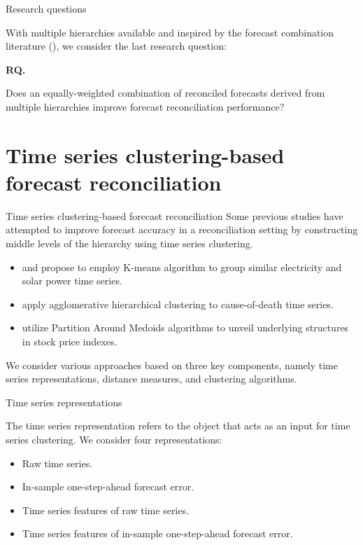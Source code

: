 \documentclass[aspectratio=169]{beamer}
\newcounter{researchquestion}
\newenvironment{researchquestion}{%
    \refstepcounter{researchquestion}%
    \par\medskip\noindent%
    \textbf{RQ\theresearchquestion.}~%
}{\medskip}
\begin{document}
\begin{frame}{Research questions}
	
	With {\color{red} multiple hierarchies available} and inspired by the forecast combination literature (\citealp{wangForecastCombinations50year2022}), we consider the last research question:

	\begin{researchquestion}
		Does an equally-weighted combination of reconciled forecasts derived from multiple hierarchies improve forecast reconciliation performance?
	\end{researchquestion}
\end{frame}



\section{Time series clustering-based forecast reconciliation}

\begin{frame}{Time series clustering-based forecast reconciliation}
	Some previous studies have attempted to improve forecast accuracy in a reconciliation setting by constructing middle levels of the hierarchy using time series clustering.

	\begin{itemize}
		\item \cite{pangHierarchicalElectricityTime2018} and \cite{pangHierarchicalElectricityTime2022} propose to employ K-means algorithm to group similar electricity and solar power time series.
		\item \cite{liForecastReconciliationApproach2019} apply agglomerative hierarchical clustering to cause-of-death time series.
		\item \cite{matteraImprovingOutofSampleForecasts2023} utilize Partition Around Medoids algorithms to unveil underlying structures in stock price indexes.
	\end{itemize}

	We consider various approaches based on three key components, namely {\color{red} time series representations}, {\color{red} distance measures}, and {\color{red} clustering algorithms}.
\end{frame}

\begin{frame}{Time series representations}

	The time series representation refers to the object that acts as an input for time series clustering. We consider four representations:
	\begin{itemize}
		\item {Raw time series}.
		\item {In-sample one-step-ahead forecast error}. 
		\item {Time series features of raw time series}.
		\item {Time series features of in-sample one-step-ahead forecast error}.
	\end{itemize}
\end{frame}
\end{document}

